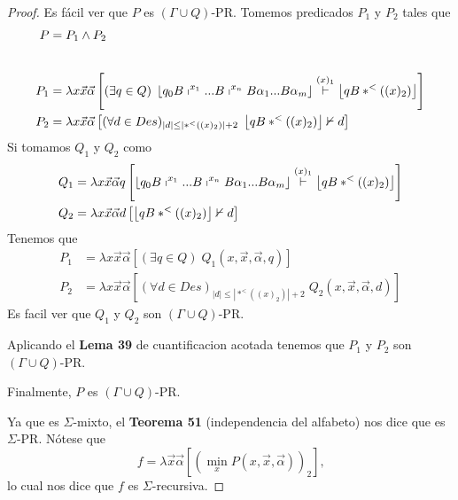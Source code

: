 \begin{proof}
    Es fácil ver que $P$ es $(\Gamma \cup Q)$-PR.
    Tomemos predicados $P_1$ y $P_2$ tales que
    \begin{align*}
      P   &=  P_1 \land P_2 \\[20pt]
      P_1 &=  \lambda x \vec{x} \vec{\alpha}
              \left[
                (\exists q\in Q)\;
                \left\lfloor q_{0}B\shortmid ^{x_{1}}...B\shortmid ^{x_{n}}B\alpha _{1}...B\alpha _{m}\right\rfloor
                \overset{(x)_{1}}{\vdash }
                \left\lfloor qB\ast ^{< }((x)_{2})\right\rfloor
              \right] \\
      P_2 &=  \lambda x \vec{x} \vec{\alpha}
              \left[
                (\forall d\in Des)
                _{\left\vert d\right\vert \leq \left\vert \ast ^{< }((x)_{2})\right\vert +2}\;
                \left\lfloor qB\ast ^{< }((x)_{2})\right\rfloor \nvdash d
              \right]
    \end{align*}
    Si tomamos $Q_1$ y $Q_2$ como
    \begin{align*}
      Q_1 &=  \lambda x \vec{x} \vec{\alpha} q
              \left[
                \left\lfloor q_{0}B\shortmid ^{x_{1}}...B\shortmid ^{x_{n}}B\alpha _{1}...B\alpha _{m}\right\rfloor
                \overset{(x)_{1}}{\vdash }
                \left\lfloor qB\ast ^{< }((x)_{2})\right\rfloor
              \right] \\
      Q_2 &=  \lambda x \vec{x} \vec{\alpha} d
              \left[
                \left\lfloor qB\ast ^{< }((x)_{2})\right\rfloor \nvdash d
              \right]
    \end{align*}
    Tenemos que
    \begin{align*}
      P_1 &=  \lambda x \vec{x} \vec{\alpha}
              \left[
                (\exists q\in Q)\;
                Q_1(x, \vec{x}, \vec{\alpha}, q)
              \right] \\
      P_2 &=  \lambda x \vec{x} \vec{\alpha}
              \left[
                (\forall d\in Des)
                _{\left\vert d\right\vert \leq \left\vert \ast ^{< }((x)_{2})\right\vert +2}\;
                Q_2(x, \vec{x}, \vec{\alpha}, d)
              \right]
    \end{align*}
    Es facil ver que $Q_1$ y $Q_2$ son $(\Gamma \cup Q)$-PR.

    \noindent Aplicando el \textbf{Lema 39} de cuantificacion acotada tenemos que $P_1$ y $P_2$ son
    $(\Gamma \cup Q)$-PR.

    \noindent Finalmente, $P$ es $(\Gamma \cup Q)$-PR.

    \noindent Ya que es $\Sigma $-mixto, el \textbf{Teorema 51} (independencia del alfabeto) nos dice que es
    $\Sigma $-PR. Nótese que
    \[
      f=\lambda \vec{x}\vec{\alpha}\left[ \left( \min_{x}P(x,\vec{x},\vec{\alpha} )\right) _{2}\right] \text{,}
    \]
    lo cual nos dice que $f$ es $\Sigma $-recursiva.
  \end{proof}

